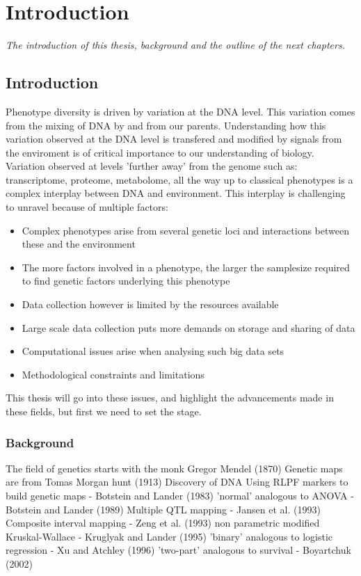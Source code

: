 \chapter{Introduction}
\emph{The introduction of this thesis, background and the outline of the next chapters.}

\null
\vfill
\newpage

\section{Introduction}

Phenotype diversity is driven by variation at the DNA level. This variation comes from the mixing of 
DNA by and from our parents. Understanding how this variation observed at the DNA level is transfered 
and modified by signals from the enviroment is of critical importance to our understanding of 
biology. Variation observed at levels 'further away' from the genome such as: transcriptome, proteome, 
metabolome, all the way up to classical phenotypes is a complex interplay between DNA and 
environment. This interplay is challenging to unravel because of multiple factors:\\
\begin{itemize}
\item Complex phenotypes arise from several genetic loci and interactions between these and the 
environment
\item The more factors involved in a phenotype, the larger the samplesize required to find genetic 
factors underlying this phenotype
\item Data collection however is limited by the resources available
\item Large scale data collection puts more demands on storage and sharing of data
\item Computational issues arise when analysing such big data sets
\item Methodological constraints and limitations
\end{itemize}

This thesis will go into these issues, and highlight the advancements made in these 
fields, but first we need to set the stage.

\subsection{Background}

The field of genetics starts with the monk Gregor Mendel (1870)
Genetic maps are from Tomas Morgan hunt (1913)
Discovery of DNA
Using RLPF markers to build genetic maps - Botstein and Lander (1983)
'normal' analogous to ANOVA - Botstein and Lander (1989)
Multiple QTL mapping - Jansen et al. (1993)
Composite interval mapping -  Zeng et al. (1993)
non parametric modified Kruskal-Wallace - Kruglyak and Lander (1995)
'binary' analogous to logistic regression - Xu and Atchley (1996)
'two-part' analogous to survival - Boyartchuk (2002)

